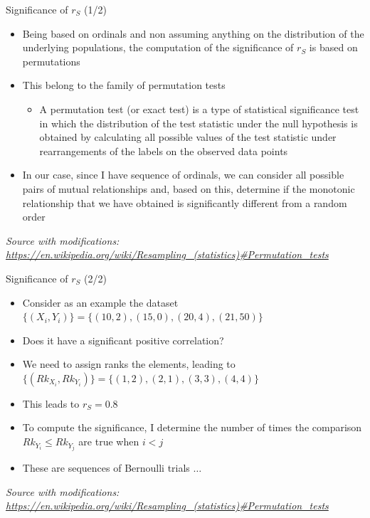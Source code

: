 \documentclass{beamer}
\begin{document}
\begin{frame}
{\centerline{Significance of $r_S$ (1/2)}}

\begin{itemize}
    \item Being based on ordinals and non assuming anything on the distribution of the underlying populations, the computation of the significance of $r_S$ is based on permutations
    \item This belong to the family of permutation tests
    \begin{itemize}
    \item A permutation test (or exact test) is a type of statistical significance test in which the distribution of the test statistic under the null hypothesis is obtained by calculating all possible values of the test statistic under rearrangements of the labels on the observed data points
    \end{itemize}
    \item In our case, since I have sequence of ordinals, we can consider all possible pairs of mutual relationships and, based on this, determine if the monotonic relationship that we have obtained is significantly different from a random order
    
\end{itemize}

\textit{\tiny
\vspace{-\baselineskip}
Source with modifications: \url{https://en.wikipedia.org/wiki/Resampling_(statistics)\#Permutation_tests}}
\end{frame}

\begin{frame}
{\centerline{Significance of $r_S$ (2/2)}}

\begin{itemize}
    \item Consider as an example the dataset $\{(X_i,Y_i)\} = \{(10,2), (15, 0), (20, 4), (21,50)\}$
    \item Does it have a significant positive correlation?
    \item We need to assign ranks the elements, leading to $\{(Rk_{X_i},Rk_{Y_i})\} = \{(1,2), (2, 1), (3, 3), (4,4)\}$
    \item This leads to $r_S = 0.8$
    \item To compute the significance, I determine the number of times the comparison $Rk_{Y_i} \leq Rk_{Y_j}$ are true when $i<j$
    \item These are sequences of Bernoulli trials $\ldots$
    
\end{itemize}

\textit{\tiny
\vspace{-\baselineskip}
Source with modifications: \url{https://en.wikipedia.org/wiki/Resampling_(statistics)\#Permutation_tests}}
\end{frame}
\end{document}
